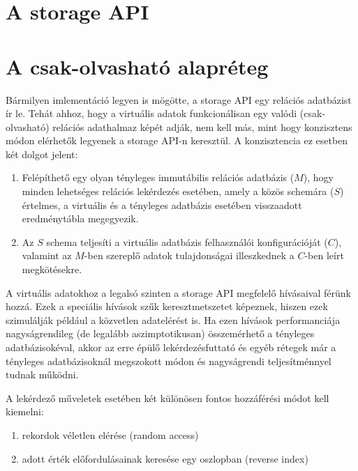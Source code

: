 \documentclass[
    parspace,
    noindent,
    nohyp,
]{elteiktdk}[2023/04/10]
\newcommand{\longcomment}[2]{\todo[inline]{Long comment: #1}}
\begin{document}

\section{A storage API}


\longcomment{Storage API ötletelés}{
schemák, táblák és oszlopok
indexek
   normál
   rendezetlen (optimalizálás-egyszerűsítés, kezelhető normál indexek halmazaként is)
   full-text
   spatial???
}

\section{A csak-olvasható alapréteg}

Bármilyen imlementáció legyen is mögötte, a storage API egy relációs adatbázist ír le.
Tehát ahhoz, hogy a virtuális adatok funkcionálisan egy valódi (csak-olvasható) relációs adathalmaz képét adják,
nem kell más, mint hogy konzisztens módon elérhetők legyenek a storage API-n keresztül.
A konzisztencia ez esetben két dolgot jelent:

\begin{enumerate}
  \item Felépíthető egy olyan tényleges immutábilis relációs adatbázis ($M$),
        hogy minden lehetséges relációs lekérdezés esetében, amely a közös schemára ($S$) értelmes,
        a virtuális és a tényleges adatbázis esetében visszaadott eredménytábla megegyezik.
  \item Az $S$ schema teljesíti a virtuális adatbázis felhasználói konfigurációját ($C$),
        valamint az $M$-ben szereplő adatok tulajdonságai illeszkednek a $C$-ben leírt megkötésekre.
\end{enumerate}

A virtuális adatokhoz a legalsó szinten a storage API megfelelő hívásaival férünk hozzá.
Ezek a speciális hívások szűk keresztmetszetet képeznek,
hiszen ezek szimulálják például a közvetlen adatelérést is.
Ha ezen hívások performanciája nagyságrendileg (de legalább aszimptotikusan) összemérhető a tényleges adatbázisokéval,
akkor az erre épülő lekérdezésfuttató és egyéb rétegek már
a tényleges adatbázisoknál megszokott módon és nagyságrendi teljesítménnyel tudnak működni.

A lekérdező műveletek esetében két különösen fontos hozzáférési módot kell kiemelni:

\begin{enumerate}
  \item rekordok véletlen elérése (random access)
  \item adott érték előfordulásainak keresése egy oszlopban (reverse index)
\end{enumerate}
\end{document}

